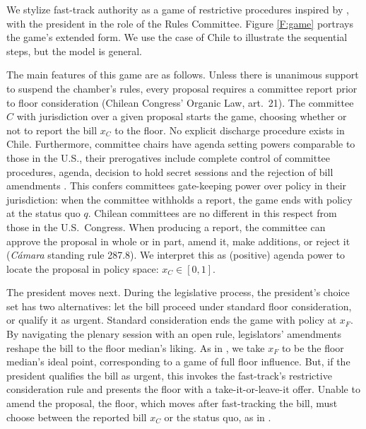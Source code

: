 \documentclass[letter,12pt]{article}
\begin{document}
We stylize fast-track authority as a game of restrictive procedures inspired by \citet{dion.huber.1996}, with the president in the role of the Rules Committee. Figure \ref{F:game} portrays the game's extended form. We use the case of Chile to illustrate the sequential steps, but the model is general. 

The main features of this game are as follows. Unless there is unanimous support to suspend the chamber's rules, every proposal requires a committee report prior to floor consideration (Chilean Congress' Organic Law, art.~21). The committee $C$ with jurisdiction over a given proposal starts the game, choosing whether or not to report the bill $x_C$ to the floor. No explicit discharge procedure exists in Chile. Furthermore, committee chairs have agenda setting powers comparable to those in the U.S., their prerogatives include complete control of committee procedures, agenda, decision to hold secret sessions and the rejection of bill amendments \citep{danesi.2010, aleman.navia.UrgChi.2009}. This confers committees gate-keeping power over policy in their jurisdiction: when the committee withholds a report, the game ends with policy at the status quo $q$. Chilean committees are no different in this respect from those in the U.S.\ Congress. When producing a report, the committee can approve the proposal in whole or in part, amend it, make additions, or reject it (\emph{Cámara} standing rule 287.8). We interpret this as (positive) agenda power to locate the proposal in policy space: $x_C \in [0,1]$. 

The president moves next. During the legislative process, the president's choice set has two alternatives: let the bill proceed under standard floor consideration, or qualify it as urgent. Standard consideration ends the game with policy at $x_F$. By navigating the plenary session with an open rule, legislators' amendments reshape the bill to the floor median's liking. As in \citet{shepsle.1979}, we take $x_F$ to be the floor median's ideal point, corresponding to a game of full floor influence. But, if the president qualifies the bill as urgent, this invokes the fast-track's restrictive consideration rule and presents the floor with a take-it-or-leave-it offer. Unable to amend the proposal, the floor, which moves after fast-tracking the bill, must choose between the reported bill $x_C$ or the status quo, as in \citep{romer.rosenthal.1978}.
  
\end{document}
